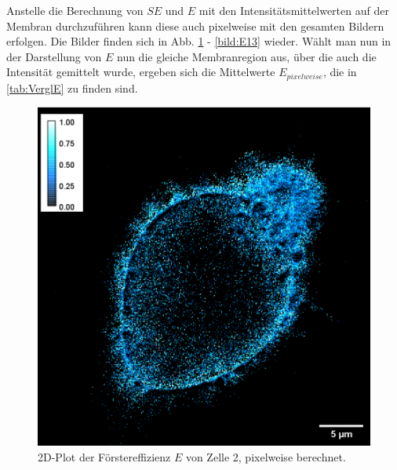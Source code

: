 Anstelle die Berechnung von $SE$ und $E$ mit den Intensitätsmittelwerten auf der Membran durchzuführen kann diese auch pixelweise 
mit den gesamten Bildern erfolgen. Die Bilder finden sich in Abb. \ref{bild:E2} - \ref{bild:E13} wieder. Wählt man nun in der Darstellung 
von $E$ nun die gleiche 
Membranregion aus, über die auch die Intensität gemittelt wurde, ergeben sich die Mittelwerte $E_{pixelweise}$, die in \ref{tab:VerglE} 
zu finden sind.

\begin{figure}[h]
    \centering
    \includegraphics[scale = 0.45]{Bilder/E2.png}
    \caption{2D-Plot der Förstereffizienz $E$ von Zelle 2, pixelweise berechnet.}
    \label{bild:E2}
\end{figure}

